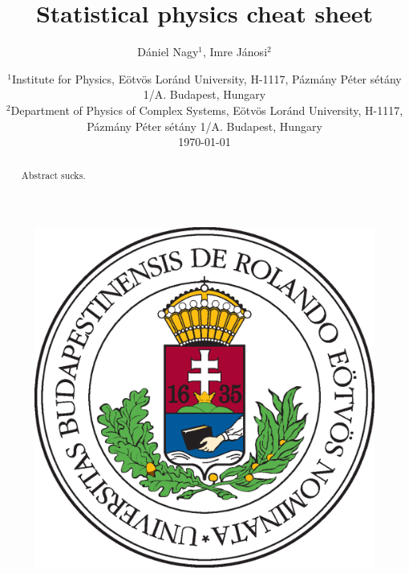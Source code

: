 \documentclass[11pt, a4paper]{article}
\title{Statistical physics cheat sheet}
\author{Dániel Nagy$^1$, Imre Jánosi$^2$}
\date{%
    $^1$Institute for Physics, Eötvös Loránd University, H-1117, Pázmány Péter sétány 1/A. Budapest, Hungary\\%
    $^2$Department of Physics of Complex Systems, Eötvös Loránd University, H-1117, Pázmány Péter sétány 1/A. Budapest, Hungary\\[2ex]%
    \today
}
\begin{document}
\maketitle
\vspace{0.5cm}
\begin{figure}[h!]
    \centering
    \includegraphics[scale=0.3]{images/elte.eps}
\end{figure}
\vspace{0.5cm}

\begin{abstract}
    Abstract sucks.
\end{abstract}
\end{document}
